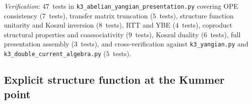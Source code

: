 \noindent\textit{Verification}: $47$~tests in
\texttt{k3\_abelian\_yangian\_presentation.py}
covering OPE consistency ($7$~tests), transfer matrix truncation
($5$~tests), structure function unitarity and Koszul inversion
($8$~tests), RTT and YBE ($4$~tests), coproduct structural
properties and coassociativity ($9$~tests), Koszul duality
($6$~tests), full presentation assembly ($3$~tests), and
cross-verification against \texttt{k3\_yangian.py} and
\texttt{k3\_double\_current\_algebra.py} ($5$~tests).



\subsection{Explicit structure function at the Kummer point}
\label{subsec:k3-explicit-structure-function}

